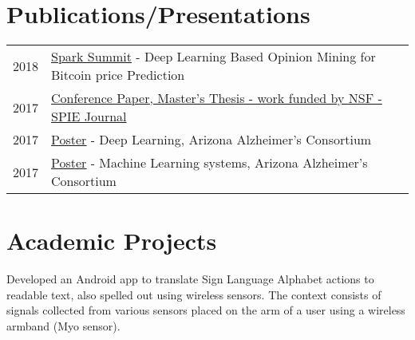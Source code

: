 \documentclass[hidelinks,letterpaper]{deedy-resume-openfont} %
\begin{document}
\begin{minipage}[t]{0.66\textwidth}



\section{Publications/Presentations} 

\begin{tabular}{rl}
2018     & \href{https://databricks.com/session/deep-learning-based-opinion-mining-for-bitcoin-price-prediction}{\underline{Spark Summit}} - Deep Learning Based Opinion Mining for Bitcoin price Prediction \\
2017     & \href{https://www.researchgate.net/publication/321141639_Deep_Learning_based_Classification_of_FDG-PET_Data_for_Alzheimers_Disease_Categories}{\underline{Conference Paper}, Master's Thesis - work funded by NSF - SPIE Journal} \\
2017	 & \href{http://gsl.lab.asu.edu/archive/Posters/AAC2017_Singh_DeepLearning.pdf}{\underline{Poster}} - Deep Learning, Arizona Alzheimer's Consortium \\
2017     & \href{http://gsl.lab.asu.edu/archive/Posters/AAC2017_Srivastava_3DPatch.pdf}{\underline{Poster}} - Machine Learning systems, Arizona Alzheimer's Consortium \\
\end{tabular}


\sectionsep
\section{Academic Projects}

\small Developed an Android app to translate Sign Language Alphabet actions to readable text, also spelled out using wireless sensors. The context consists of signals collected from various sensors placed on the arm of a user using a wireless armband (Myo sensor). 


\end{minipage}
\end{document}
